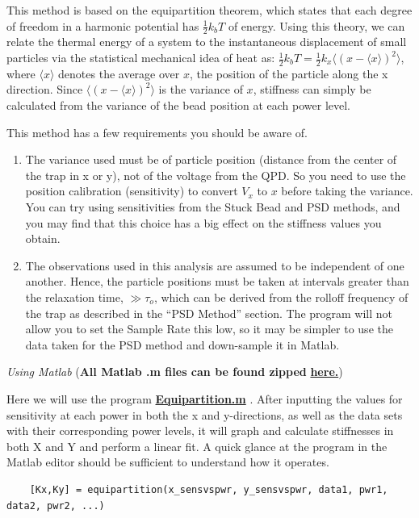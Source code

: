 \documentclass{../lab}
\begin{document}
This method is based on the equipartition theorem, which states that each degree of freedom in a harmonic potential has $\frac{1}{2}k_bT $ of energy. Using this theory, we can relate the thermal energy of a system to the instantaneous displacement of small particles via the statistical mechanical idea of heat as: $  \frac{1}{2}k_b T = \frac{1}{2}k_x \langle(x-\langle x\rangle)^2\rangle $, where $\langle x\rangle $ denotes the average over $x$, the position of the particle along the x direction. Since $\langle(x-\langle x\rangle)^2\rangle $ is the variance of $x$, stiffness can simply be calculated from the variance of the bead position at each power level.

This method has a few requirements you should be aware of.

\begin{enumerate}
    \item The variance used must be of particle position (distance from the center of the trap in x or y), not of the voltage from the QPD. So you need to use the position calibration (sensitivity) to convert $V_x$ to $x$ before taking the variance. You can try using sensitivities from the Stuck Bead and PSD methods, and you may find that this choice has a big effect on the stiffness values you obtain.

    \item The observations used in this analysis are assumed to be independent of one another. Hence, the particle positions must be taken at intervals greater than the relaxation time, $\gg \tau_o$, which can be derived from the rolloff frequency of the trap as described in the ``PSD Method'' section. The program will not allow you to set the Sample Rate this low, so it may be simpler to use the data taken for the PSD method and down-sample it in Matlab.

\end{enumerate}

\emph{Using Matlab } (\textbf{All Matlab .m files can be found zipped }\href{http://experimentationlab.berkeley.edu/sites/default/files/ZIP\_files/OTZ\_Matlab\_files.zip}{\textbf{here.}})

Here we will use the program \href{http://experimentationlab.berkeley.edu/sites/default/files/matlab\_fitting/Equipartition.m}{\textbf{Equipartition.m}} . After inputting the values for sensitivity at each power in both the x and y-directions, as well as the data sets with their corresponding power levels, it will graph and calculate stiffnesses in both X and Y and perform a linear fit. A quick glance at the program in the Matlab editor should be sufficient to understand how it operates.
\begin{verbatim}
    [Kx,Ky] = equipartition(x_sensvspwr, y_sensvspwr, data1, pwr1, data2, pwr2, ...)
\end{verbatim}
\end{document}
